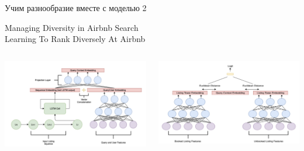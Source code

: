 \documentclass[11pt,aspectratio=169,handout]{beamer}
\begin{document}
\begin{frame}{Учим разнообразие вместе с моделью 2}

\begin{center}
Managing Diversity in Airbnb Search \cite{AIRBNB} \\
Learning To Rank Diversely At Airbnb \cite{AIRBNB2}
\end{center}

\begin{columns}

\begin{column}{0.45\textwidth}
\begin{center}
\includegraphics[scale=0.25]{images/airbnb2.png}
\end{center}
\end{column}

\begin{column}{0.45\textwidth} 
\begin{center}
\includegraphics[scale=0.25]{images/airbnb.png}
\end{center}
\end{column}

\end{columns}

\end{frame}
\end{document}
